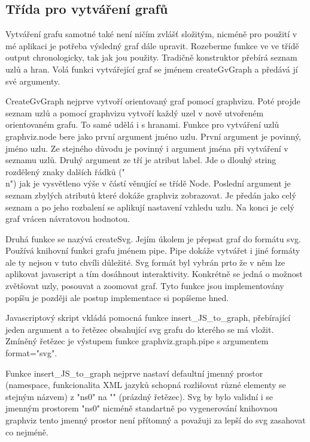 \documentclass[color,table,oneside,nolot,nolof]{fithesis}
\begin{document}
\subsection{Třída pro vytváření grafů}
	Vytváření grafu samotné také není ničím zvlášť složitým, nicméně pro použití v mé aplikaci je potřeba výsledný graf dále upravit. Rozeberme funkce ve ve třídě output chronologicky,
	tak jak jou použity. Tradičně konstruktor přebírá seznam uzlů a hran. Volá funkci vytvářející graf se jménem createGvGraph a předává jí své argumenty. 

	CreateGvGraph nejprve vytvoří orientovaný graf pomocí graphvizu. Poté projde seznam uzlů a pomocí graphvizu vytvoří každý uzel v nově utvořeném orientovaném grafu. To samé udělá i
	s hranami. Funkce pro vytváření uzlů graphviz.node bere jako první argument jméno uzlu. První argument je povinný, jméno uzlu. Ze stejného důvodu je povinný i argument jména
	při vytváření v seznamu uzlů. Druhý argument ze tří je atribut label. Jde o dlouhý string rozdělený znaky dalších řádků ("\\n") jak je vysvětleno výše v částí věnující se třídě Node.
	Poslední argument je seznam zbylých atributů které dokáže graphviz zobrazovat. Je předán jako celý seznam a po jeho rozbalení se aplikují nastavení vzhledu uzlu. Na konci je celý
	graf vrácen návratovou hodnotou.

	Druhá funkce se nazývá createSvg. Jejím úkolem je přepsat graf do formátu svg. Používá knihovní funkci grafu jménem pipe. Pipe dokáže vytvářet i jiné formáty ale ty nejsou v tuto
	chvíli důležité. Svg formát byl vybrán prto že v něm lze aplikovat javascript a tím dosáhnout interaktivity. Konkrétně se jedná o možnost zvětšovat uzly, posouvat a zoomovat graf.
	Tyto funkce jsou implementovány popíšu je později ale postup implementace si popíšeme hned.

	Javascriptový skript vkládá pomocná funkce insert\_JS\_to\_graph, přebírající jeden argument a to řetězec obsahující svg grafu do kterého se má vložit. Zmíněný řetězec je výstupem funkce
	graphviz.graph.pipe s argumentem format="svg". 

	Funkce insert\_JS\_to\_graph nejprve nastaví defaultní jmenný prostor (namespace, funkcionalita XML jazyků schopná rozlišovat různé elementy se stejným názvem) z "ns0" na "" (prázdný 
	řetězec). Svg by bylo validní i se jmenným prostorem "ns0" nicméně standartně po vygenerování knihovnou graphviz tento jmenný prostor není přítomný a považuji za lepší do svg 
	zasahovat co nejméně. 
\end{document}
